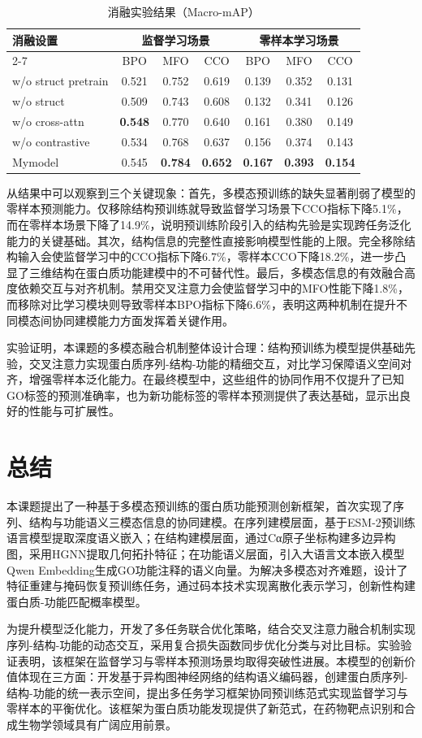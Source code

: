 \begin{table}[h]
\centering
\caption{消融实验结果（Macro-mAP）}
\begin{tabular}{lcccccc}
\hline
\multirow{2}{*}{消融设置} & \multicolumn{3}{c}{监督学习场景} & \multicolumn{3}{c}{零样本学习场景} \\
\cline{2-7}
 & BPO & MFO & CCO & BPO & MFO & CCO \\
\hline
w/o struct pretrain & 0.521 & 0.752 & 0.619 & 0.139 & 0.352 & 0.131 \\
w/o struct & 0.509 & 0.743 & 0.608 & 0.132 & 0.341 & 0.126 \\
w/o cross-attn & \textbf{0.548} & 0.770 & 0.640 & 0.161 & 0.380 & 0.149 \\
w/o contrastive & 0.534 & 0.768 & 0.637 & 0.156 & 0.374 & 0.143 \\
Mymodel & 0.545 & \textbf{0.784} & \textbf{0.652} & \textbf{0.167} & \textbf{0.393} & \textbf{0.154} \\
\hline
\end{tabular}%

\end{table}

从结果中可以观察到三个关键现象：首先，多模态预训练的缺失显著削弱了模型的零样本预测能力。仅移除结构预训练就导致监督学习场景下CCO指标下降5.1\%，而在零样本场景下降了14.9\%，说明预训练阶段引入的结构先验是实现跨任务泛化能力的关键基础。其次，结构信息的完整性直接影响模型性能的上限。完全移除结构输入会使监督学习中的CCO指标下降6.7\%，零样本CCO下降18.2\%，进一步凸显了三维结构在蛋白质功能建模中的不可替代性。最后，多模态信息的有效融合高度依赖交互与对齐机制。禁用交叉注意力会使监督学习中的MFO性能下降1.8\%，而移除对比学习模块则导致零样本BPO指标下降6.6\%，表明这两种机制在提升不同模态间协同建模能力方面发挥着关键作用。

实验证明，本课题的多模态融合机制整体设计合理：结构预训练为模型提供基础先验，交叉注意力实现蛋白质序列-结构-功能的精细交互，对比学习保障语义空间对齐，增强零样本泛化能力。在最终模型中，这些组件的协同作用不仅提升了已知GO标签的预测准确率，也为新功能标签的零样本预测提供了表达基础，显示出良好的性能与可扩展性。

\section{总结}
本课题提出了一种基于多模态预训练的蛋白质功能预测创新框架，首次实现了序列、结构与功能语义三模态信息的协同建模。在序列建模层面，基于ESM-2预训练语言模型提取深度语义嵌入；在结构建模层面，通过Cα原子坐标构建多边异构图，采用HGNN提取几何拓扑特征；在功能语义层面，引入大语言文本嵌入模型Qwen Embedding生成GO功能注释的语义向量。为解决多模态对齐难题，设计了特征重建与掩码恢复预训练任务，通过码本技术实现离散化表示学习，创新性构建蛋白质-功能匹配概率模型。

为提升模型泛化能力，开发了多任务联合优化策略，结合交叉注意力融合机制实现序列-结构-功能的动态交互，采用复合损失函数同步优化分类与对比目标。实验验证表明，该框架在监督学习与零样本预测场景均取得突破性进展。本模型的创新价值体现在三方面：开发基于异构图神经网络的结构语义编码器，创建蛋白质序列-结构-功能的统一表示空间，提出多任务学习框架协同预训练范式实现监督学习与零样本的平衡优化。该框架为蛋白质功能发现提供了新范式，在药物靶点识别和合成生物学领域具有广阔应用前景。
